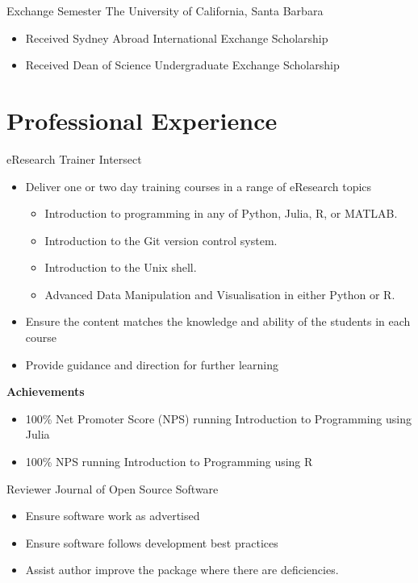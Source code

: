 {Exchange Semester}
{The University of California, Santa Barbara}{}{}
{%
\begin{itemize}
  \item Received Sydney Abroad International Exchange Scholarship
  \item Received Dean of Science Undergraduate Exchange Scholarship
\end{itemize}
}
\vspace{1em}

\nocite{*}
\printbibliography[title={Selected Publications}]

\pagebreak
\section{Professional Experience}

{eResearch Trainer}
{Intersect}{}{}
{%
  \begin{itemize}
    \item Deliver one or two day training courses in a range of eResearch topics
      \begin{itemize}
        \item Introduction to programming in any of Python, Julia, R, or MATLAB.
        \item Introduction to the Git version control system.
        \item Introduction to the Unix shell.
        \item Advanced Data Manipulation and Visualisation in either Python or R.
      \end{itemize}
    \item Ensure the content matches the knowledge and ability of the students in each
      course
    \item Provide guidance and direction for further learning
  \end{itemize}
  \textbf{Achievements}
  \begin{itemize}
    \item 100\% Net Promoter Score (NPS) running Introduction to Programming using Julia
    \item 100\% NPS running Introduction to Programming using R
  \end{itemize}
}
\vspace{1em}

{Reviewer}
{Journal of Open Source Software}{}{}
{%
  \begin{itemize}
    \item Ensure software work as advertised
    \item Ensure software follows development best practices
    \item Assist author improve the package where there are deficiencies.
  \end{itemize}
}

